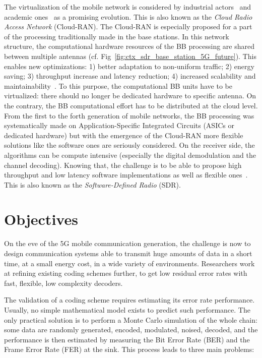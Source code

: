 The virtualization of the mobile network is considered by industrial
actors~\cite{Huawei2013,Ericsson2015} and academic ones~\cite{Wubben2014,
Rost2014,Checko2015a} as a promising evolution. This is also known as the
\emph{Cloud Radio Access Network} (Cloud-RAN). The Cloud-RAN is especially
proposed for a part of the processing traditionally made in the base stations.
In this network structure, the computational hardware resources of the BB
processing are shared between multiple antennas (cf.
Fig~\ref{fig:ctx_sdr_base_station_5G_future}). This enables new optimizations:
1) better adaptation to non-uniform traffic; 2) energy saving; 3) throughput
increase and latency reduction; 4) increased scalability and
maintainability~\cite{Checko2015a}. To this purpose, the computational BB units
have to be virtualized: there should no longer be dedicated hardware to specific
antenna. On the contrary, the BB computational effort has to be distributed at
the cloud level. From the first to the forth generation of mobile networks, the
BB processing was systematically made on Application-Specific Integrated
Circuits (ASICs or dedicated hardware) but with the emergence of the Cloud-RAN
more flexible solutions like the software ones are seriously considered. On the
receiver side, the algorithms can be compute intensive (especially the digital
demodulation and the channel decoding). Knowing that, the challenge is to be
able to propose high throughput and low latency software implementations as well
as flexible ones~\cite{Nikaein2015,Rodriguez2017}. This is also known as the
\emph{Software-Defined Radio} (SDR).

\section{Objectives}

On the eve of the 5G mobile communication generation, the challenge is now to
design communication systems able to transmit huge amounts of data in a short
time, at a small energy cost, in a wide variety of environments. Researchers
work at refining existing coding schemes further, to get low residual error
rates with fast, flexible, low complexity decoders.

The validation of a coding scheme requires estimating its error rate
performance. Usually, no simple mathematical model exists to predict such
performance. The only practical solution is to perform a Monte Carlo simulation
of the whole chain: some data are randomly generated, encoded, modulated,
noised, decoded, and the performance is then estimated by measuring the Bit
Error Rate (BER) and the Frame Error Rate (FER) at the sink. This process leads
to three main problems:

